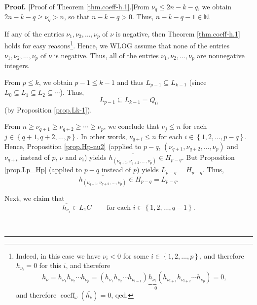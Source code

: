 \documentclass[numbers=enddot,12pt,final,onecolumn,notitlepage]{scrartcl}%
\theoremstyle{definition}
\newenvironment{proof}[1][Proof]{\noindent\textbf{#1.} }{\ \rule{0.5em}{0.5em}}
\begin{document}
\begin{proof}
[Proof of Theorem \ref{thm.coeff-h.1}.]From $\nu_{q}\leq2n-k-q$, we obtain
$2n-k-q\geq\nu_{q}>n$, so that $n-k-q>0$. Thus, $n-k-q-1\in\mathbb{N}$.

If any of the entries $\nu_{1},\nu_{2},\ldots,\nu_{p}$ of $\nu$ is negative,
then Theorem \ref{thm.coeff-h.1} holds for easy reasons\footnote{Indeed, in
this case we have $\nu_{i}<0$ for some $i\in\left\{  1,2,\ldots,p\right\}  $,
and therefore $h_{\nu_{i}}=0$ for this $i$, and therefore
\[
h_{\nu}=h_{\nu_{1}}h_{\nu_{2}}\cdots h_{\nu_{p}}=\left(  h_{\nu_{1}}h_{\nu
_{2}}\cdots h_{\nu_{i-1}}\right)  \underbrace{h_{\nu_{i}}}_{=0}\left(
h_{\nu_{i+1}}h_{\nu_{i+2}}\cdots h_{\nu_{p}}\right)  =0,
\]
and therefore $\operatorname*{coeff}\nolimits_{\omega}\left(  \overline
{h_{\nu}}\right)  =0$, qed.}. Hence, we WLOG assume that none of the entries
$\nu_{1},\nu_{2},\ldots,\nu_{p}$ of $\nu$ is negative. Thus, all of the
entries $\nu_{1},\nu_{2},\ldots,\nu_{p}$ are nonnegative integers.

From $p\leq k$, we obtain $p-1\leq k-1$ and thus $L_{p-1}\subseteq L_{k-1}$
(since $L_{0}\subseteq L_{1}\subseteq L_{2}\subseteq\cdots$). Thus,%
\begin{equation}
L_{p-1}\subseteq L_{k-1}=Q_{0} \label{pf.thm.coeff-h.1.Lp-1}%
\end{equation}
(by Proposition \ref{prop.Lk-1}).

From $n\geq\nu_{q+1}\geq\nu_{q+2}\geq\cdots\geq\nu_{p}$, we conclude that
$\nu_{j}\leq n$ for each $j\in\left\{  q+1,q+2,\ldots,p\right\}  $. In other
words, $\nu_{q+i}\leq n$ for each $i\in\left\{  1,2,\ldots,p-q\right\}  $.
Hence, Proposition \ref{prop.Hp-nu2} (applied to $p-q$, $\left(  \nu_{q+1}%
,\nu_{q+2},\ldots,\nu_{p}\right)  $ and $\nu_{q+i}$ instead of $p$, $\nu$ and
$\nu_{i}$) yields $\overline{h_{\left(  \nu_{q+1},\nu_{q+2},\ldots,\nu
_{p}\right)  }}\in H_{p-q}$. But Proposition \ref{prop.Lp=Hp} (applied to
$p-q$ instead of $p$) yields $L_{p-q}=H_{p-q}$. Thus,%
\begin{equation}
\overline{h_{\left(  \nu_{q+1},\nu_{q+2},\ldots,\nu_{p}\right)  }}\in
H_{p-q}=L_{p-q}. \label{pf.thm.coeff-h.1.1}%
\end{equation}


Next, we claim that%
\begin{equation}
\overline{h_{\nu_{i}}}\in L_{1}C\ \ \ \ \ \ \ \ \ \ \text{for each }%
i\in\left\{  1,2,\ldots,q-1\right\}  . \label{pf.thm.coeff-h.1.2}%
\end{equation}



\end{proof}
\end{document}
